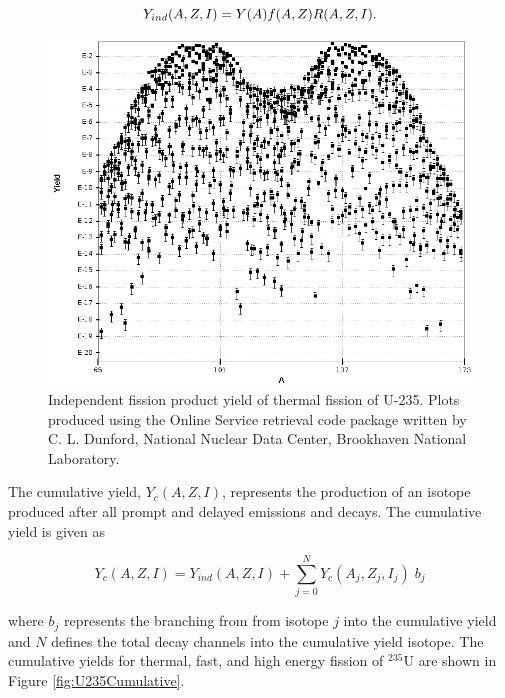 \begin{equation} \label{eq:Indy}
Y_{ind}(A,Z,I) = Y(A) \space f(A,Z) \space R(A,Z,I). 
\end{equation}

\begin{figure}[h!]
	\includegraphics[width=\linewidth]{Figures/Chapter2/indfy.png}
	\caption[Independent fission product yield of thermal fission of U-235]{Independent fission product yield of thermal fission of U-235. Plots produced using the Online Service retrieval code package written by C. L. Dunford, National Nuclear Data Center, Brookhaven National Laboratory.}
	\label{fig:indy}
\end{figure}

The cumulative yield, $Y_{c}(A,Z,I)$, represents the production of an isotope produced after all prompt and delayed emissions and decays. The cumulative yield is given as \cite{Privas2016}

\begin{equation} \label{eq:Cumulative}
Y_{c}(A,Z,I) = Y_{ind}(A,Z,I) + \sum_{j=0}^N Y_{c}(A_{j},Z_{j},I_{j}) \; b_{j} 
\end{equation}

\noindent where $b_{j}$ represents the branching from from isotope $j$ into the cumulative yield and $N$ defines the total decay channels into the cumulative yield isotope. 
The cumulative yields for thermal, fast, and high energy fission of $^{235}$U are shown in Figure \ref{fig:U235Cumulative}. 


